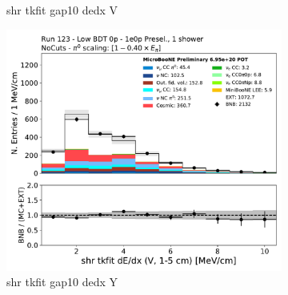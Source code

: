 \begin{figure}[H]
\begin{subfigure}{0.3\textwidth}
    \caption{shr tkfit gap10 dedx V}
    \end{subfigure}
    \begin{subfigure}{0.3\textwidth}
    \includegraphics[width=1.0\textwidth]{1e0p/Low_BDT_Sideband/shr_tkfit_gap10_dedx_V.pdf}
    \caption{shr tkfit gap10 dedx Y}
    \end{subfigure}
    \caption{} 
    \label{fig:HE_1eNp_1}
\end{figure}

